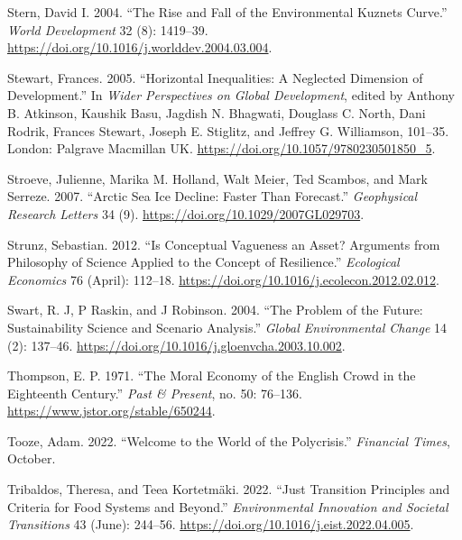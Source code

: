 \documentclass[
  a4paper,
  openany]{book}
\newlength{\cslhangindent}
\newenvironment{CSLReferences}[2] %
 {\begin{list}{}{%
  \setlength{\itemindent}{0pt}
  \setlength{\leftmargin}{0pt}
  \setlength{\parsep}{0pt}
  \ifodd #1
   \setlength{\leftmargin}{\cslhangindent}
   \setlength{\itemindent}{-1\cslhangindent}
  \fi
  \setlength{\itemsep}{#2\baselineskip}}}
 {\end{list}}
\begin{document}
\begin{CSLReferences}{1}{0}
Stern, David I. 2004. {``The {Rise} and {Fall} of the {Environmental
Kuznets Curve}.''} \emph{World Development} 32 (8): 1419--39.
\url{https://doi.org/10.1016/j.worlddev.2004.03.004}.

Stewart, Frances. 2005. {``Horizontal {Inequalities}: {A Neglected
Dimension} of {Development}.''} In \emph{Wider {Perspectives} on {Global
Development}}, edited by Anthony B. Atkinson, Kaushik Basu, Jagdish N.
Bhagwati, Douglass C. North, Dani Rodrik, Frances Stewart, Joseph E.
Stiglitz, and Jeffrey G. Williamson, 101--35. London: Palgrave Macmillan
UK. \url{https://doi.org/10.1057/9780230501850_5}.

Stroeve, Julienne, Marika M. Holland, Walt Meier, Ted Scambos, and Mark
Serreze. 2007. {``Arctic Sea Ice Decline: {Faster} Than Forecast.''}
\emph{Geophysical Research Letters} 34 (9).
\url{https://doi.org/10.1029/2007GL029703}.

Strunz, Sebastian. 2012. {``Is Conceptual Vagueness an Asset?
{Arguments} from Philosophy of Science Applied to the Concept of
Resilience.''} \emph{Ecological Economics} 76 (April): 112--18.
\url{https://doi.org/10.1016/j.ecolecon.2012.02.012}.

Swart, R. J, P Raskin, and J Robinson. 2004. {``The Problem of the
Future: Sustainability Science and Scenario Analysis.''} \emph{Global
Environmental Change} 14 (2): 137--46.
\url{https://doi.org/10.1016/j.gloenvcha.2003.10.002}.

Thompson, E. P. 1971. {``The {Moral Economy} of the {English Crowd} in
the {Eighteenth Century}.''} \emph{Past \& Present}, no. 50: 76--136.
\url{https://www.jstor.org/stable/650244}.

Tooze, Adam. 2022. {``Welcome to the World of the Polycrisis.''}
\emph{Financial Times}, October.

Tribaldos, Theresa, and Teea Kortetmäki. 2022. {``Just Transition
Principles and Criteria for Food Systems and Beyond.''}
\emph{Environmental Innovation and Societal Transitions} 43 (June):
244--56. \url{https://doi.org/10.1016/j.eist.2022.04.005}.


\end{CSLReferences}
\end{document}
